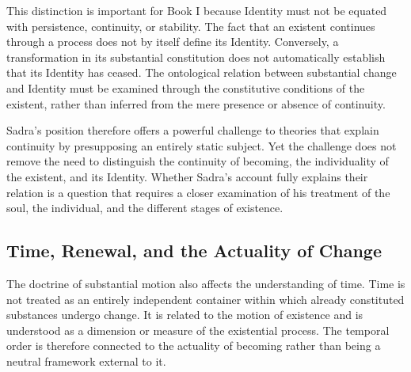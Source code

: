 \label{para:VS.B01.P01.C08.S17.SS10.P004}

This distinction is important
for Book I because Identity
must not be equated with
persistence, continuity, or
stability. The fact that
an existent continues through
a process does not by itself
define its Identity. Conversely,
a transformation in its
substantial constitution does
not automatically establish
that its Identity has ceased.
The ontological relation
between substantial change
and Identity must be examined
through the constitutive
conditions of the existent,
rather than inferred from
the mere presence or absence
of continuity.

\label{para:VS.B01.P01.C08.S17.SS10.P005}

Sadra's position therefore
offers a powerful challenge
to theories that explain
continuity by presupposing
an entirely static subject.
Yet the challenge does not
remove the need to distinguish
the continuity of becoming,
the individuality of the
existent, and its Identity.
Whether Sadra's account
fully explains their relation
is a question that requires
a closer examination of
his treatment of the soul,
the individual, and the
different stages of existence.




\subsection{Time, Renewal, and the Actuality of Change}
\label{subsec:ch08_s17_ss11}

\label{para:VS.B01.P01.C08.S17.SS11.P001}

The doctrine of substantial
motion also affects the
understanding of time. Time
is not treated as an entirely
independent container within
which already constituted
substances undergo change.
It is related to the motion
of existence and is understood
as a dimension or measure
of the existential process.
The temporal order is therefore
connected to the actuality
of becoming rather than
being a neutral framework
external to it.

\label{para:VS.B01.P01.C08.S17.SS11.P002}

